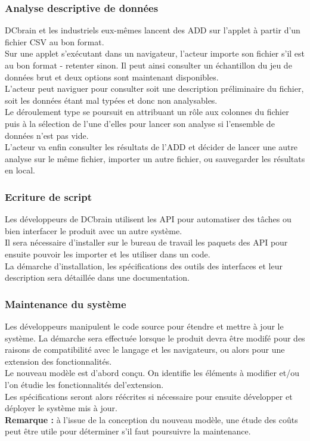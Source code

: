 			\subsubsection{Analyse descriptive de données}
				DCbrain et les industriels eux-mêmes lancent des ADD sur l'applet à partir d'un fichier CSV au bon format.\\
				Sur une applet s'exécutant dans un navigateur, l'acteur importe son fichier s'il est au bon format - retenter sinon. Il peut ainsi consulter un échantillon du jeu de données brut et deux options sont maintenant disponibles.\\
				L'acteur peut naviguer pour consulter soit une description préliminaire du fichier, soit les données étant mal typées et donc non analysables.\\
				Le déroulement type se poursuit en attribuant un rôle aux colonnes du fichier puis à la sélection de l'une d'elles pour lancer son analyse si l'ensemble de données n'est pas vide.\\
				L'acteur va enfin consulter les résultats de l'ADD et décider de lancer une autre analyse sur le même fichier, importer un autre fichier, ou sauvegarder les résultats en local.
				
			\subsubsection{Ecriture de script}
				Les développeurs de DCbrain utilisent les API pour automatiser des tâches ou bien interfacer le produit avec un autre système.\\
				Il sera nécessaire d'installer sur le bureau de travail les paquets des API pour ensuite pouvoir les importer et les utiliser dans un code.\\
				La démarche d'installation, les spécifications des outils des interfaces et leur description sera détaillée dans une documentation.
				
			\subsubsection{Maintenance du système}
				Les développeurs manipulent le code source pour étendre et mettre à jour le système. La démarche sera effectuée lorsque le produit devra être modifé pour des raisons de compatibilité avec le langage et les navigateurs, ou alors pour une extension des fonctionnalités.\\
				Le nouveau modèle est d'abord conçu. On identifie les éléments à modifier et/ou l'on étudie les fonctionnalités del'extension.\\
				Les spécifications seront alors réécrites si nécessaire pour ensuite développer et déployer le système mis à jour.\\
				\textbf{Remarque :} à l'issue de la conception du nouveau modèle, une étude des coûts peut être utile pour déterminer s'il faut poursuivre la maintenance.
				
